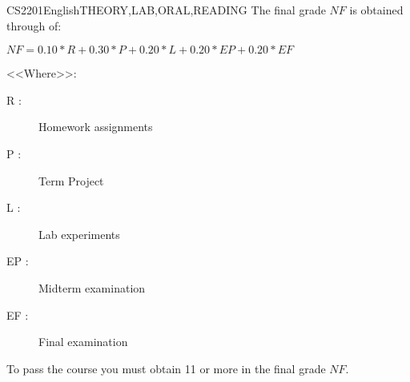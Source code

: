 \begin{evaluation}{CS2201}{English}{THEORY,LAB,ORAL,READING}
The final grade $NF$ is obtained through of:

 $ NF =  0.10*R + 0.30*P + 0.20*L + 0.20*EP + 0.20*EF $

<<Where>>:
\begin{description}
   \item[R :] Homework assignments
   \item[P :] Term Project
   \item[L :] Lab experiments
   \item[EP :] Midterm examination
   \item[EF :] Final examination
\end{description}

	To pass the course you must obtain 11 or more in the final grade $NF$.
\end{evaluation}

